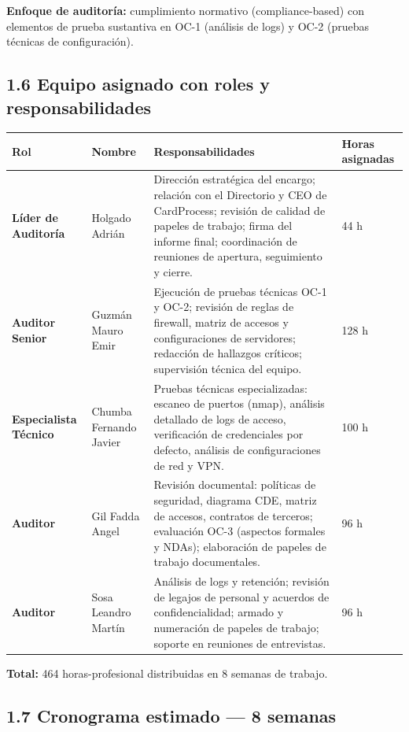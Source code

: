 \documentclass[11pt,a4paper]{article}
\begin{document}
\textbf{Enfoque de auditoría:} cumplimiento normativo (compliance-based) con elementos de prueba sustantiva en OC-1 (análisis de logs) y OC-2 (pruebas técnicas de configuración).

\subsection{1.6 Equipo asignado con roles y responsabilidades}

\begin{tabularx}{\textwidth}{P{2.5cm}P{3cm}P{2.5cm}L}
\toprule
\textbf{Rol} & \textbf{Nombre} & \textbf{Responsabilidades} & \textbf{Horas asignadas} \\
\midrule
\textbf{Líder de Auditoría} & Holgado Adrián & Dirección estratégica del encargo; relación con el Directorio y CEO de CardProcess; revisión de calidad de papeles de trabajo; firma del informe final; coordinación de reuniones de apertura, seguimiento y cierre. & 44 h \\
\textbf{Auditor Senior} & Guzmán Mauro Emir & Ejecución de pruebas técnicas OC-1 y OC-2; revisión de reglas de firewall, matriz de accesos y configuraciones de servidores; redacción de hallazgos críticos; supervisión técnica del equipo. & 128 h \\
\textbf{Especialista Técnico} & Chumba Fernando Javier & Pruebas técnicas especializadas: escaneo de puertos (nmap), análisis detallado de logs de acceso, verificación de credenciales por defecto, análisis de configuraciones de red y VPN. & 100 h \\
\textbf{Auditor} & Gil Fadda Angel & Revisión documental: políticas de seguridad, diagrama CDE, matriz de accesos, contratos de terceros; evaluación OC-3 (aspectos formales y NDAs); elaboración de papeles de trabajo documentales. & 96 h \\
\textbf{Auditor} & Sosa Leandro Martín & Análisis de logs y retención; revisión de legajos de personal y acuerdos de confidencialidad; armado y numeración de papeles de trabajo; soporte en reuniones de entrevistas. & 96 h \\
\bottomrule
\end{tabularx}

\textbf{Total:} 464 horas-profesional distribuidas en 8 semanas de trabajo.

\subsection{1.7 Cronograma estimado — 8 semanas}
\end{document}
